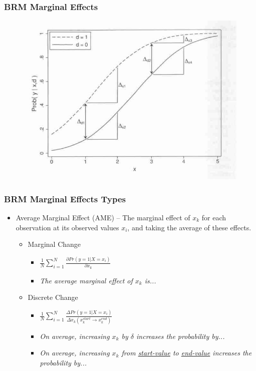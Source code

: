 \documentclass{beamer}
\begin{document}
\begin{frame}
	\frametitle{BRM Marginal Effects}
		\begin{figure}[p]
			\centering
			\includegraphics[scale=0.45]{images/brm_marginal_effects.png}
			\label{fig:fig2}
		\end{figure}
\end{frame}

\begin{frame}
	\frametitle{BRM Marginal Effects Types}
		\begin{itemize}
			\item Average Marginal Effect (AME) -- The marginal effect of $x_{k}$ for each observation at its observed values $x_{i}$, and taking the average of these effects.
				\begin{itemize}
					\item Marginal Change
						\begin{itemize}
							\item $\frac{1}{N}\sum_{i=1}^{N}\frac{\partial Pr\left(y=1|X=x_{i}\right)}{\partial x_{k}}$
							\item \textit{The average marginal effect of $x_{k}$ is...}
						\end{itemize}
					\item Discrete Change
						\begin{itemize}
							\item $\frac{1}{N}\sum_{i=1}^{N}\frac{\Delta Pr\left(y=1|X=x_{i}\right)}{\Delta x_{k}\left(x^{start}_{k}\rightarrow x^{end}_{k}\right)}$
							\item \textit{On average, increasing $x_{k}$ by $\delta$ increases the probability by...}
							\item \textit{On average, increasing $x_{k}$ from \underline{start-value} to \underline{end-value} increases the probability by...}
						\end{itemize}
				\end{itemize}
		\end{itemize}
\end{frame}
\end{document}
